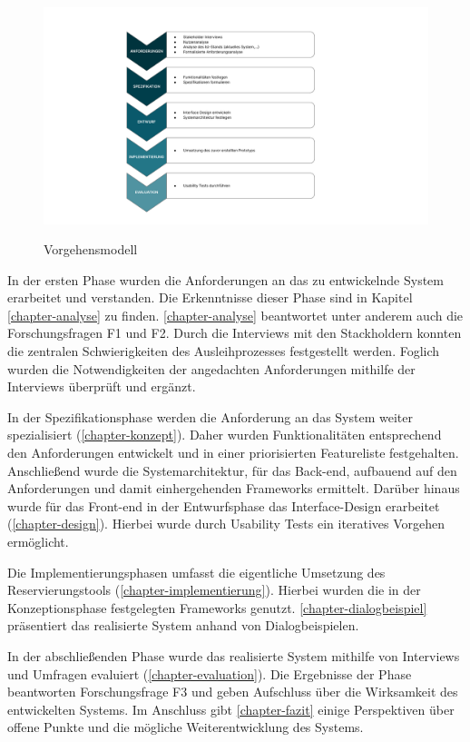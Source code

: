 \begin{figure}[h]
  \centering
  \includegraphics[scale=0.6]{Bilder/Vorgehensmodell.pptx.pdf}
  \label{fig:schablone}
  \caption[Vorgehensmodell]{Vorgehensmodell}
\end{figure}

In der ersten Phase wurden die Anforderungen an das zu entwickelnde System erarbeitet und
verstanden. Die Erkenntnisse dieser Phase sind in Kapitel \ref{chapter-analyse} zu finden.
\ref{chapter-analyse} beantwortet unter anderem auch die Forschungsfragen F1 und F2. Durch die
Interviews mit den Stackholdern konnten die zentralen Schwierigkeiten des Ausleihprozesses
festgestellt werden. Foglich wurden die Notwendigkeiten der angedachten Anforderungen mithilfe der
Interviews überprüft und ergänzt. 

In der Spezifikationsphase werden die Anforderung an das System weiter spezialisiert
(\ref{chapter-konzept}). Daher wurden Funktionalitäten entsprechend den Anforderungen entwickelt und
in einer priorisierten Featureliste festgehalten. Anschließend wurde die Systemarchitektur, für das
Back-end, aufbauend auf den Anforderungen und damit einhergehenden Frameworks ermittelt. Darüber
hinaus wurde für das Front-end in der Entwurfsphase das Interface-Design erarbeitet
(\ref{chapter-design}). Hierbei wurde durch Usability Tests ein iteratives Vorgehen ermöglicht.

Die Implementierungsphasen umfasst die eigentliche Umsetzung des Reservierungstools
(\ref{chapter-implementierung}). Hierbei wurden die in der Konzeptionsphase festgelegten Frameworks
genutzt. \ref{chapter-dialogbeispiel} präsentiert das realisierte System anhand von
Dialogbeispielen.

In der abschließenden Phase wurde das realisierte System mithilfe von Interviews und Umfragen
evaluiert (\ref{chapter-evaluation}). Die Ergebnisse der Phase beantworten Forschungsfrage F3 und
geben Aufschluss über die Wirksamkeit des entwickelten Systems. Im Anschluss gibt
\ref{chapter-fazit} einige Perspektiven über offene Punkte und die mögliche Weiterentwicklung des
Systems. 